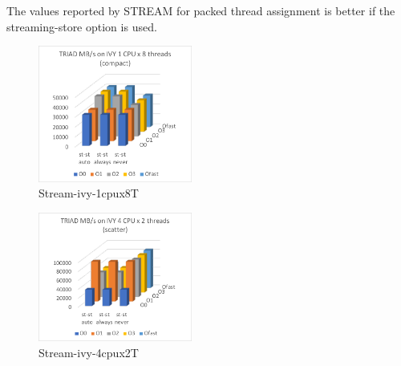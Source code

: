 \documentclass[conference]{IEEEtran}
\begin{document}
The values reported by STREAM for packed thread assignment is better
if the streaming-store option is used.
%
%
\begin{figure}[tb]
\centering
\includegraphics[width=0.45\textwidth]{figs/stream-ivy-1cpux8T.pdf}
\caption{Stream-ivy-1cpux8T}
\label{fig:stream-ivy-1cpux8T}
\end{figure}
\begin{figure}[tb]
\centering
\includegraphics[width=0.45\textwidth]{figs/stream-ivy-4cpux2T.pdf}
\caption{Stream-ivy-4cpux2T}
\label{fig:stream-ivy-4cpux2T}
\end{figure}
\fi
%
\end{document}
